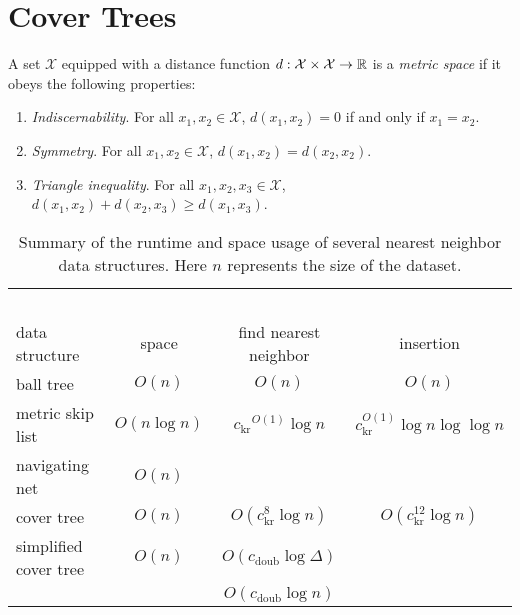 \documentclass[../main.tex]{subfiles}
\newcommand{\set}[1]{\mathcal {#1}}
\newcommand{\dist}[2]{\distf({#1},{#2})}
\newcommand{\distf}{d}
\newcommand{\aspect}[1]{\Delta}
\newcommand{\krnum}{c_\text{kr}}
\newcommand{\doubnum}{c_\text{doub}}
\begin{document}
\chapter{Cover Trees}

\begin{definition}
    A set $\set X$ equipped with a distance function $\distf : \set X \times \set X \to \R$ is a \emph{metric space} if it obeys the following properties:
    \begin{enumerate}
        \item \emph{Indiscernability}.  For all $x_1,x_2\in\set X$, $\dist{x_1}{x_2} = 0$ if and only if $x_1=x_2$.
        \item \emph{Symmetry}. For all $x_1,x_2\in\set X$, $\dist{x_1}{x_2} = \dist{x_2}{x_2}$.
        \item \emph{Triangle inequality}.  For all $x_1,x_2,x_3\in\set X$, $\dist{x_1}{x_2} + \dist{x_2}{x_3}\ge\dist{x_1}{x_3}$.
    \end{enumerate}
\end{definition}

\begin{table}[H]
    \small
    \centering
    \begin{tabular}{lccc}
        \toprule
        \vspace{-0.25in}
        &~\hspace{1.2in}~&~\hspace{1.2in}~&~\hspace{1.2in}~\\
        data structure & space & find nearest neighbor & insertion \\
        \midrule
        ball tree \cite{} & $O(n)$ & $O(n)$ & $O(n)$ \\
        metric skip list \cite{karger2002finding} & $O(n\log n)$ & $\krnum{}^{O(1)}\log n$ & $\krnum^{O(1)}\log n\log\log n$ \\
        navigating net \cite{} & $O(n)$ \\
        cover tree \cite{} & $O(n)$ & $O(\krnum^8\log n)$ & $O(\krnum^{12}\log n)$ \\
        simplified cover tree & $O(n)$ & $O(\doubnum{}\log \aspect{})$ \\
                              &        & $O(\doubnum{}\log n)$ \\
        \bottomrule
    \end{tabular}
    \caption{
        Summary of the runtime and space usage of several nearest neighbor data structures.
        Here $n$ represents the size of the dataset.
    }
\end{table}
\end{document}
